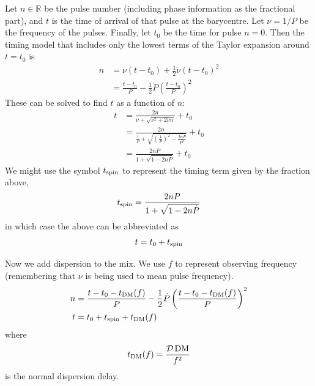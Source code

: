 \documentclass{book}
\begin{document}
Let $n \in \mathbb{R}$ be the pulse number (including phase information as the fractional part), and $t$ is the time of arrival of that pulse at the barycentre.
Let $\nu = 1/P$ be the frequency of the pulses.
Finally, let $t_0$ be the time for pulse $n = 0$.
Then the timing model that includes only the lowest terms of the Taylor expansion around $t = t_0$ is
\begin{equation}
  \begin{aligned}
    n &= \nu(t - t_0) + \frac12 \dot{\nu} (t - t_0)^2\\
      &= \frac{t - t_0}{P} - \frac12 \dot{P} \left(\frac{t - t_0}{P}\right)^2
  \end{aligned}
\end{equation}
These can be solved to find $t$ as a function of $n$:
\begin{equation}
  \begin{aligned}
    t &= \frac{2n}{\nu + \sqrt{\nu^2 + 2\dot{\nu}n}} + t_0 \\
      &= \frac{2n}{\frac{1}{P} + \sqrt{\left(\frac{1}{P}\right)^2 - \frac{2n\dot{P}}{P^2}}} + t_0 \\
      &= \frac{2nP}{1 + \sqrt{1 - 2n\dot{P}}} + t_0
  \end{aligned}
\end{equation}
\newcommand{\tspin}{\ensuremath{t_{\rm spin}}}
We might use the symbol $\tspin$ to represent the timing term given by the fraction above,
\begin{equation}
  \tspin = \frac{2nP}{1 + \sqrt{1 - 2n\dot{P}}}
\end{equation}
in which case the above can be abbreviated as
\begin{equation}
  t = t_0 + \tspin
\end{equation}

Now we add dispersion to the mix.
We use $f$ to represent observing frequency (remembering that $\nu$ is being used to mean pulse frequency).
\newcommand{\tDM}{\ensuremath{t_{\rm DM}}}
\begin{equation}
  \begin{aligned}
    n &= \frac{t - t_0 - \tDM(f)}{P} - \frac12 \dot{P} \left(\frac{t - t_0 - \tDM(f)}{P}\right)^2 \\
    t &= t_0 + \tspin + \tDM(f)
  \end{aligned}
\end{equation}
where
\begin{equation}
  \tDM(f) = \frac{\mathcal{D}\,{\rm DM}}{f^2}
\end{equation}
is the normal dispersion delay.
\end{document}
